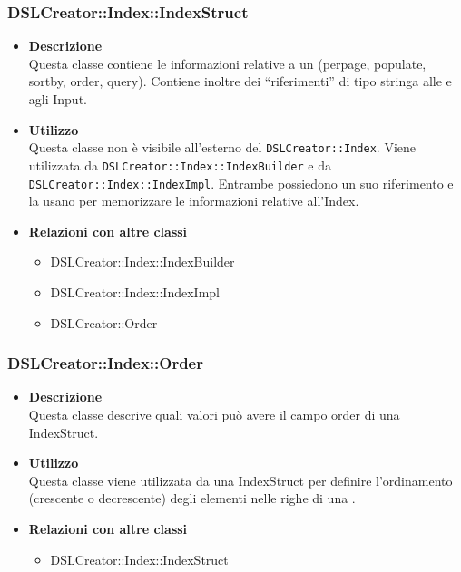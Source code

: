  \subsubsection{DSLCreator::Index::IndexStruct}
                    \begin{itemize}
                        \item \textbf{Descrizione} \hfill \\
                          Questa classe contiene le informazioni relative a un  (perpage, populate, sortby, order, query). Contiene inoltre dei ``riferimenti'' di tipo stringa alle  e agli Input.
                        \item \textbf{Utilizzo} \hfill \\
                          Questa classe non è visibile all'esterno del  \texttt{DSLCreator::Index}. Viene utilizzata da \texttt{DSLCreator::Index::IndexBuilder} e da \texttt{DSLCreator::Index::IndexImpl}. Entrambe possiedono un suo riferimento e la usano per memorizzare le informazioni relative all'Index.
                        \item \textbf{Relazioni con altre classi}
                            \begin{itemize}
                              \item DSLCreator::Index::IndexBuilder
                              \item DSLCreator::Index::IndexImpl
                              \item DSLCreator::Order
                            \end{itemize}
                    \end{itemize}

 \subsubsection{DSLCreator::Index::Order}
                    \begin{itemize}
                        \item \textbf{Descrizione} \hfill \\
                          Questa classe descrive quali valori può avere il campo order di una IndexStruct. 
                        \item \textbf{Utilizzo} \hfill \\
                          Questa classe viene utilizzata da una IndexStruct per definire l'ordinamento (crescente o decrescente) degli elementi nelle righe di una .
                        \item \textbf{Relazioni con altre classi}
                            \begin{itemize}
                              \item DSLCreator::Index::IndexStruct
                            \end{itemize}
                    \end{itemize}


